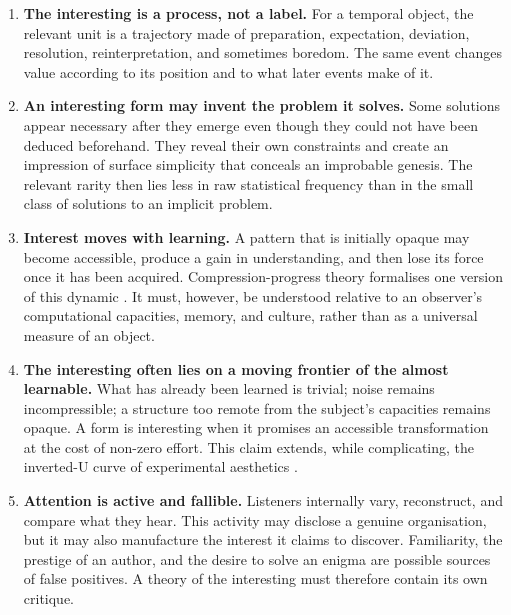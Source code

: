 \documentclass[11pt,a4paper]{article}
\begin{document}
\begin{enumerate}
  \item \textbf{The interesting is a process, not a label.} For a temporal
  object, the relevant unit is a trajectory made of preparation, expectation,
  deviation, resolution, reinterpretation, and sometimes boredom. The same
  event changes value according to its position and to what later events make of
  it.

  \item \textbf{An interesting form may invent the problem it solves.} Some
  solutions appear necessary after they emerge even though they could not have
  been deduced beforehand. They reveal their own constraints and create an
  impression of surface simplicity that conceals an improbable genesis. The
  relevant rarity then lies less in raw statistical frequency than in the small
  class of solutions to an implicit problem.

  \item \textbf{Interest moves with learning.} A pattern that is initially
  opaque may become accessible, produce a gain in understanding, and then lose
  its force once it has been acquired. Compression-progress theory formalises
  one version of this dynamic
  \parencite{schmidhuber1997interesting,schmidhuber2009compression}. It must,
  however, be understood relative to an observer's computational capacities,
  memory, and culture, rather than as a universal measure of an object.

  \item \textbf{The interesting often lies on a moving frontier of the almost
  learnable.} What has already been learned is trivial; noise remains
  incompressible; a structure too remote from the subject's capacities remains
  opaque. A form is interesting when it promises an accessible transformation
  at the cost of non-zero effort. This claim extends, while complicating, the
  inverted-U curve of experimental aesthetics
  \parencite{berlyne1974studies,abdallah2009information}.

  \item \textbf{Attention is active and fallible.} Listeners internally vary,
  reconstruct, and compare what they hear. This activity may disclose a genuine
  organisation, but it may also manufacture the interest it claims to discover.
  Familiarity, the prestige of an author, and the desire to solve an enigma are
  possible sources of false positives. A theory of the interesting must
  therefore contain its own critique.
\end{enumerate}
\end{document}

